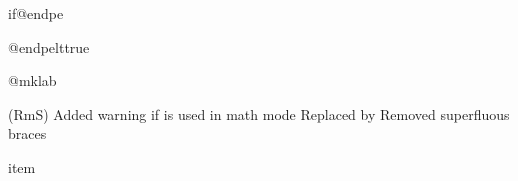     \begin{teX}
\def\@endparenv{%
  \addpenalty\@endparpenalty\addvspace\@topsepadd\@endpetrue}
    \end{teX}

    \begin{teX}
\def\@doendpe{\@endpetrue
     \def\par{\@restorepar\everypar{}
          \par\@endpefalse}\everypar
    \end{teX}
    
    Use |\setbox0=\lastbox| instead of   |\hskip -\parindent|   
    so that a |\noindent| becomes a no-op when used before 
    a line immediately following a list environment(23 Oct 86).
 \changes{v1.0k}{1995/11/07}{Enclosed \refCom{setbox0} assignment by a
 group so that it leaves the contents of box $0$ intact.
    } 
    \begin{teX}
               {{\setbox\z@\lastbox}\everypar{}\@endpefalse}}
    \end{teX}
 

  \begin{docCommand}{if@endpe}{}
 \end{docCommand}
  \begin{docCommand}{@endpelttrue}{}
 \end{docCommand}
    \begin{teX}
\newif\if@endpe
\@endpefalse
    \end{teX}

 \begin{docCommand}{@mklab}{}
 \end{docCommand}
    \begin{teX}
\def\@mklab#1{\hfil #1}
    \end{teX}

     {(RmS) Added warning if  is used in math mode}
     {Replaced  by }
     {Removed superfluous braces}
     
 \begin{docCommand}{item}{}
 \end{docCommand}     
     \begin{teX}
\def\item{%
  \@inmatherr\item
  \@ifnextchar [\@item{\@noitemargtrue \@item[\@itemlabel]}}
    \end{teX}
 
